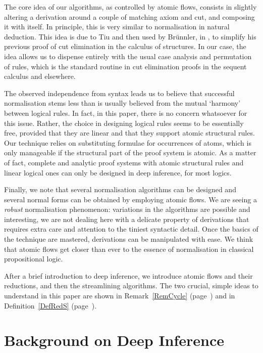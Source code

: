 \documentclass[a4paper]{LMCS}
\begin{document}
The core idea of our algorithms, as controlled by atomic flows, consists in slightly altering a derivation around a couple of matching axiom and cut, and composing it with itself. In principle, this is very similar to normalisation in natural deduction. This idea is due to Tiu and then used by Br\"unnler, in \cite{Brun:03:Atomic-C:oz}, to simplify his previous proof of cut elimination in the calculus of structures. In our case, the idea allows us to dispense entirely with the usual case analysis and permutation of rules, which is the standard routine in cut elimination proofs in the sequent calculus and elsewhere.

The observed independence from syntax leads us to believe that successful normalisation stems less than is usually believed from the mutual `harmony' between logical rules. In fact, in this paper, there is no concern whatsoever for this issue. Rather, the choice in designing logical rules seems to be essentially free, provided that they are linear and that they support atomic structural rules. Our technique relies on substituting formulae for occurrences of atoms, which is only manageable if the structural part of the proof system is atomic. As a matter of fact, complete and analytic proof systems with atomic structural rules and linear logical ones can only be designed in deep inference, for most logics.

Finally, we note that several normalisation algorithms can be designed and several normal forms can be obtained by employing atomic flows. We are seeing a \emph{robust} normalisation phenomenon: variations in the algorithms are possible and interesting, we are not dealing here with a delicate property of derivations that requires extra care and attention to the tiniest syntactic detail. Once the basics of the technique are mastered, derivations can be manipulated with ease. We think that atomic flows get closer than ever to the essence of normalisation in classical propositional logic.

After a brief introduction to deep inference, we introduce atomic flows and their reductions, and then the streamlining algorithms. The two crucial, simple ideas to understand in this paper are shown in Remark~\ref{RemCycle} (page~\pageref{RemCycle}) and in Definition~\ref{DefRedS} (page~\pageref{DefRedS}).

\section{Background on Deep Inference}
\end{document}
